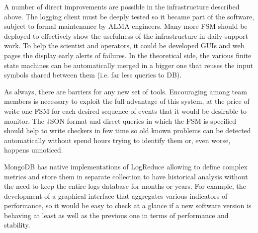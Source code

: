 \documentclass[]{spie}  %
\begin{document}
A number of direct improvements are possible in the infrastructure described
above. The logging client must be deeply tested so it became part of the
software, subject to formal maintenance by ALMA engineers. Many more FSM should
be deployed to effectively show the usefulness of the infrastructure in daily
support work. To help the scientist and operators, it could be developed GUIs
and web pages the display early alerts of failures. In the theoretical side,
the various finite state machines can be automatically merged in a bigger
one that reuses the input symbols shared between them (i.e. far less
queries to DB). 

As always, there are barriers for any new set of tools. Encouraging among team
members is necessary to exploit the full advantage of this system, at the price
of write one FSM for each desired sequence of events that it would be desirable
to monitor. The JSON format and direct queries in which the FSM is specified
should help to write checkers in few time so old known problems can be detected
automatically without spend hours trying to identify them or, even worse,
              happens unnoticed.

MongoDB has native implementations of LogReduce allowing to define complex
metrics and store them in separate collection to have historical analysis
without the need to keep the entire logs database for months or years. For
example, the development of a graphical interface that aggregates various
indicators of performance, so it would be easy to check at a glance if a new
software version is behaving at least as well as the previous one in terms of
performance and stability.
 

\end{document}
